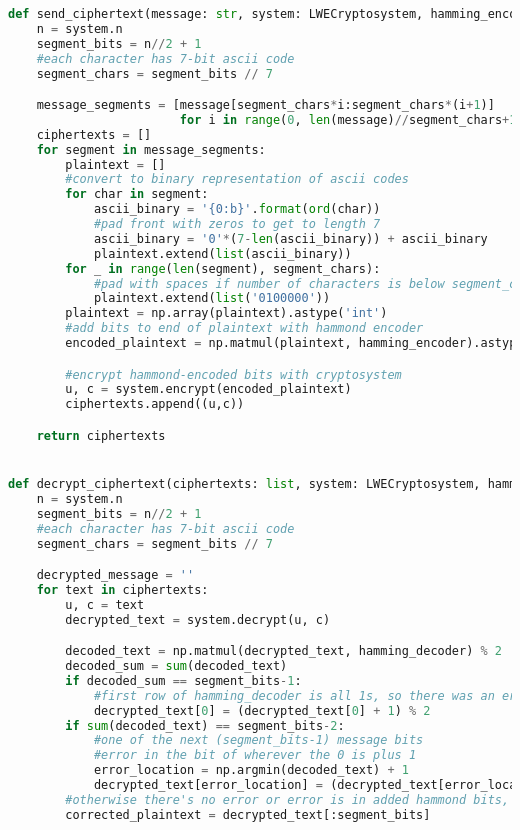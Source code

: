 \begin{lstlisting}[language=Python]
def send_ciphertext(message: str, system: LWECryptosystem, hamming_encoder: np.array):
    n = system.n
    segment_bits = n//2 + 1
    #each character has 7-bit ascii code
    segment_chars = segment_bits // 7

    message_segments = [message[segment_chars*i:segment_chars*(i+1)]
                        for i in range(0, len(message)//segment_chars+1)]
    ciphertexts = []
    for segment in message_segments:
        plaintext = []
        #convert to binary representation of ascii codes
        for char in segment:
            ascii_binary = '{0:b}'.format(ord(char))
            #pad front with zeros to get to length 7
            ascii_binary = '0'*(7-len(ascii_binary)) + ascii_binary
            plaintext.extend(list(ascii_binary))
        for _ in range(len(segment), segment_chars):
            #pad with spaces if number of characters is below segment_chars
            plaintext.extend(list('0100000'))
        plaintext = np.array(plaintext).astype('int')
        #add bits to end of plaintext with hammond encoder
        encoded_plaintext = np.matmul(plaintext, hamming_encoder).astype('int') % 2

        #encrypt hammond-encoded bits with cryptosystem
        u, c = system.encrypt(encoded_plaintext)
        ciphertexts.append((u,c))

    return ciphertexts


def decrypt_ciphertext(ciphertexts: list, system: LWECryptosystem, hamming_decoder: np.array):
    n = system.n
    segment_bits = n//2 + 1
    #each character has 7-bit ascii code
    segment_chars = segment_bits // 7

    decrypted_message = ''
    for text in ciphertexts:
        u, c = text
        decrypted_text = system.decrypt(u, c)

        decoded_text = np.matmul(decrypted_text, hamming_decoder) % 2
        decoded_sum = sum(decoded_text)
        if decoded_sum == segment_bits-1:
            #first row of hamming_decoder is all 1s, so there was an error in the first bit
            decrypted_text[0] = (decrypted_text[0] + 1) % 2
        if sum(decoded_text) == segment_bits-2:
            #one of the next (segment_bits-1) message bits
            #error in the bit of wherever the 0 is plus 1
            error_location = np.argmin(decoded_text) + 1
            decrypted_text[error_location] = (decrypted_text[error_location] + 1) % 2
        #otherwise there's no error or error is in added hammond bits, so we don't care
        corrected_plaintext = decrypted_text[:segment_bits]


\end{lstlisting}
